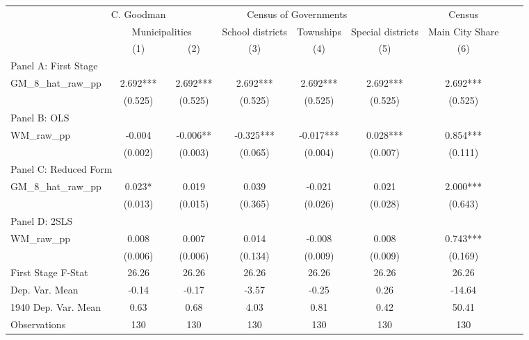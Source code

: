  \begin{tabular}{l*{8}{c}} \toprule
&\multicolumn{1}{c}{C. Goodman}&\multicolumn{4}{c}{Census of Governments}&\multicolumn{1}{c}{Census}\\\cmidrule(lr){2-2}\cmidrule(lr){3-6}\cmidrule(lr){7-7}
&\multicolumn{2}{c}{Municipalities}&\multicolumn{1}{c}{School districts}&\multicolumn{1}{c}{Townships}&\multicolumn{1}{c}{Special districts}&\multicolumn{1}{c}{Main City Share}\\\cmidrule(lr){2-3}\cmidrule(lr){4-6}\cmidrule(lr){7-7}
&\multicolumn{1}{c}{(1)}&\multicolumn{1}{c}{(2)}&\multicolumn{1}{c}{(3)}&\multicolumn{1}{c}{(4)}&\multicolumn{1}{c}{(5)}&\multicolumn{1}{c}{(6)}\\
\cmidrule(lr){1-7}
\multicolumn{6}{l}{Panel A: First Stage}\\
\cmidrule(lr){1-7}
GM\_8\_hat\_raw\_pp &    2.692***&    2.692***&    2.692***&    2.692***&    2.692***&    2.692***\\
                &  (0.525)   &  (0.525)   &  (0.525)   &  (0.525)   &  (0.525)   &  (0.525)   \\
\cmidrule(lr){1-7}
\multicolumn{6}{l}{Panel B: OLS}\\
\cmidrule(lr){1-7}
WM\_raw\_pp       &   -0.004   &   -0.006** &   -0.325***&   -0.017***&    0.028***&    0.854***\\
                &  (0.002)   &  (0.003)   &  (0.065)   &  (0.004)   &  (0.007)   &  (0.111)   \\
\cmidrule(lr){1-7}
\multicolumn{6}{l}{Panel C: Reduced Form}\\
\cmidrule(lr){1-7}
GM\_8\_hat\_raw\_pp &    0.023*  &    0.019   &    0.039   &   -0.021   &    0.021   &    2.000***\\
                &  (0.013)   &  (0.015)   &  (0.365)   &  (0.026)   &  (0.028)   &  (0.643)   \\
\cmidrule(lr){1-7}
\multicolumn{6}{l}{Panel D: 2SLS}\\
\cmidrule(lr){1-7}
WM\_raw\_pp       &    0.008   &    0.007   &    0.014   &   -0.008   &    0.008   &    0.743***\\
                &  (0.006)   &  (0.006)   &  (0.134)   &  (0.009)   &  (0.009)   &  (0.169)   \\
\midrule
First Stage F-Stat&    26.26   &    26.26   &    26.26   &    26.26   &    26.26   &    26.26   \\
Dep. Var. Mean  &    -0.14   &    -0.17   &    -3.57   &    -0.25   &     0.26   &   -14.64   \\
1940 Dep. Var. Mean&     0.63   &     0.68   &     4.03   &     0.81   &     0.42   &    50.41   \\
Observations    &      130   &      130   &      130   &      130   &      130   &      130   \\
       \bottomrule \end{tabular}
